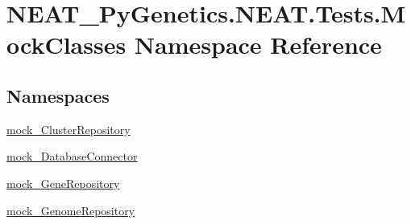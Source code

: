 \hypertarget{namespaceNEAT__PyGenetics_1_1NEAT_1_1Tests_1_1MockClasses}{}\section{N\+E\+A\+T\+\_\+\+Py\+Genetics.\+N\+E\+A\+T.\+Tests.\+Mock\+Classes Namespace Reference}
\label{namespaceNEAT__PyGenetics_1_1NEAT_1_1Tests_1_1MockClasses}
\subsection*{Namespaces}
\begin{DoxyCompactItemize}
\item 
 \hyperlink{namespaceNEAT__PyGenetics_1_1NEAT_1_1Tests_1_1MockClasses_1_1mock__ClusterRepository}{mock\+\_\+\+Cluster\+Repository}
\item 
 \hyperlink{namespaceNEAT__PyGenetics_1_1NEAT_1_1Tests_1_1MockClasses_1_1mock__DatabaseConnector}{mock\+\_\+\+Database\+Connector}
\item 
 \hyperlink{namespaceNEAT__PyGenetics_1_1NEAT_1_1Tests_1_1MockClasses_1_1mock__GeneRepository}{mock\+\_\+\+Gene\+Repository}
\item 
 \hyperlink{namespaceNEAT__PyGenetics_1_1NEAT_1_1Tests_1_1MockClasses_1_1mock__GenomeRepository}{mock\+\_\+\+Genome\+Repository}
\end{DoxyCompactItemize}
